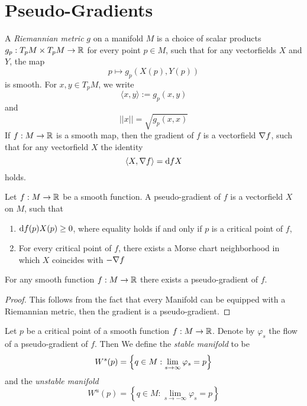 \section{Pseudo-Gradients}

\begin{definition}
    A \textit{Riemannian metric} $g$ on a manifold $M$ is a choice of scalar products
    $g_p: T_pM \times T_pM \to { \mathbb R }$ for every point $p \in M$, such that for any vectorfields
    $X$ and $Y$, the map
    \[ p \mapsto g_p(X(p), Y(p)) \]
    is smooth. For $x, y \in T_pM$, we write 
    \[ \langle x, y \rangle := g_p(x, y)\]
    and 
    \[ || x || = \sqrt{g_p(x, x)} \]
    If $f: M \to { \mathbb R }$ is a smooth map, then the gradient of $f$ is a vectorfield ${ \nabla } f$, such
    that for any vectorfield $X$ the identity
    \[ \langle X, { \nabla } f \rangle = { \operatorname{d} } f X \]
    holds.
\end{definition}

\begin{definition}
    Let $f: M \to { \mathbb R }$ be a smooth function. A pseudo-gradient of $f$ is a vectorfield
    $X$ on $M$, such that 
    \begin{enumerate}
        \item ${ \operatorname{d} } f(p) X(p) \geq 0$, where equality holds if and only if $p$ is a 
            critical point of $f$,
        \item For every critical point of $f$, there exists a Morse chart neighborhood 
            in which $X$ coincides with $-{ \nabla } f$
    \end{enumerate}
\end{definition}

\begin{lemma}
    For any smooth function $f: M \to { \mathbb R }$ there exists a pseudo-gradient of $f$.
\end{lemma}

\begin{proof}
    This follows from the fact that every Manifold can be equipped with a Riemannian
    metric, then the gradient is a pseudo-gradient.
\end{proof}

\begin{definition}
    Let $p$ be a critical point of a smooth function $f: M \to { \mathbb R }$. Denote by $\varphi_s$ the
    flow of a pseudo-gradient of $f$. Then We define the \textit{stable manifold} to be
    \[ { W^s }(p) = \left\{ q \in M: \lim_{s \to \infty} \varphi_s = p \right\} \]
    and the \textit{unstable manifold}
    \[ W^u(p) = \left\{ q \in M: \lim_{s \to -\infty} \varphi_s = p \right\} \]
\end{definition}

